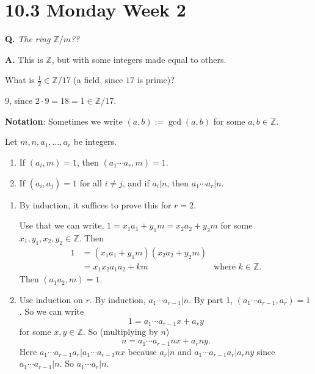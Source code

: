 \documentclass{notes}
\begin{document}
\newpage

\section{10.3 Monday Week 2}

\underline{}

{\boldmath \bfseries Q.} \textit{The ring $\mathbb Z / m$??}

{\boldmath \bfseries A.} This is $\mathbb Z$, but with some integers made equal to others.

\begin{eg}
  What is $\frac{1}{2} \in \mathbb Z / 17$ (a field, since $17$ is prime)?

  $9$, since $2 \cdot 9 = 18 = 1 \in \mathbb Z / 17$.
\end{eg}

{\boldmath \bfseries Notation}: Sometimes we write $(a, b) := \gcd(a, b)$ for some $a, b \in \mathbb Z$.

\begin{lem}
  Let $m, n, a_1, \dots, a_r$ be integers.

  \begin{enumerate}
    \item If $(a_i, m) = 1$, then $(a_1 \cdots a_r, m) = 1$.

    \item If $(a_i, a_j) = 1$ for all $i \neq j$, and if $a_i \vert n$, then $a_1 \cdots a_r \vert n$.
  \end{enumerate}
\end{lem}

\begin{prf}
  \begin{enumerate}
    \item By induction, it suffices to prove this for $r = 2$.

    Use that we can write, $1 = x_1 a_1 + y_1 m = x_2 a_2 + y_2 m$ for some $x_1, y_1, x_2, y_2 \in \mathbb Z$.
    Then 
    \begin{align*}
      1 &= (x_1 a_1 + y_1 m) (x_2 a_2 + y_2 m) \\ 
      &= x_1 x_2 a_1 a_2 + k m & \text{where $k \in \mathbb Z$}.
    \end{align*}
    Then $(a_1 a_2, m) = 1$.

    \item Use induction on $r$.
    By induction, $a_1 \cdots a_{r - 1} \vert n$.
    By part 1, $(a_1 \cdots a_{r - 1}, a_r) = 1$.
    So we can write 
    \[
      1 = a_1 \cdots a_{r - 1} x + a_r y
    \]
    for some $x, y \in \mathbb Z$.
    So (multiplying by $n$) 
    \[
      n = a_1 \cdots a_{r - 1} n x + a_r n y.
    \]
    Here $a_1 \cdots a_{r - 1} a_r \vert a_1 \cdots a_{r - 1} n x$ because $a_r \vert n$ and $a_1 \cdots a_{r - 1} a_r \vert a_r n y$ since $a_1 \cdots a_{r - 1} \vert n$.
    So $a_1 \cdots a_r \vert n$.
  \end{enumerate}
\end{prf}
\end{document}
